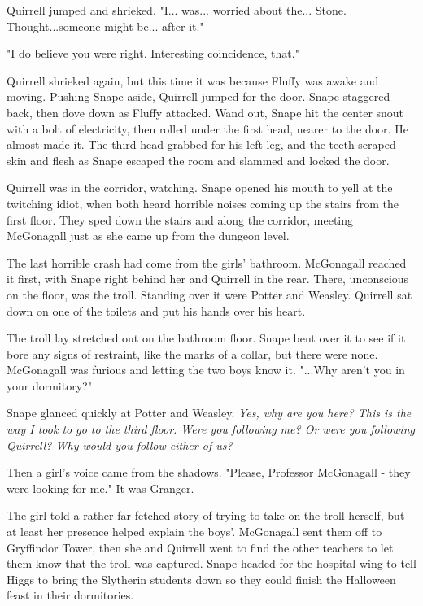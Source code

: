 \documentclass[a4paper,11pt]{article}
\begin{document}
Quirrell jumped and shrieked. "I... was... worried about the... Stone. Thought...someone might be... after it."

"I do believe you were right. Interesting coincidence, that."

Quirrell shrieked again, but this time it was because Fluffy was awake and moving. Pushing Snape aside, Quirrell jumped for the door. Snape staggered back, then dove down as Fluffy attacked. Wand out, Snape hit the center snout with a bolt of electricity, then rolled under the first head, nearer to the door. He almost made it. The third head grabbed for his left leg, and the teeth scraped skin and flesh as Snape escaped the room and slammed and locked the door.

Quirrell was in the corridor, watching. Snape opened his mouth to yell at the twitching idiot, when both heard horrible noises coming up the stairs from the first floor. They sped down the stairs and along the corridor, meeting McGonagall just as she came up from the dungeon level.

The last horrible crash had come from the girls' bathroom. McGonagall reached it first, with Snape right behind her and Quirrell in the rear. There, unconscious on the floor, was the troll. Standing over it were Potter and Weasley. Quirrell sat down on one of the toilets and put his hands over his heart.

The troll lay stretched out on the bathroom floor. Snape bent over it to see if it bore any signs of restraint, like the marks of a collar, but there were none. McGonagall was furious and letting the two boys know it. "...Why aren't you in your dormitory?"

Snape glanced quickly at Potter and Weasley. \emph{Yes, why are you here? This is the way I took to go to the third floor. Were you following me? Or were you following Quirrell? Why would you follow either of us?}

Then a girl's voice came from the shadows. "Please, Professor McGonagall - they were looking for me." It was Granger.

The girl told a rather far-fetched story of trying to take on the troll herself, but at least her presence helped explain the boys'. McGonagall sent them off to Gryffindor Tower, then she and Quirrell went to find the other teachers to let them know that the troll was captured. Snape headed for the hospital wing to tell Higgs to bring the Slytherin students down so they could finish the Halloween feast in their dormitories.
\end{document}
